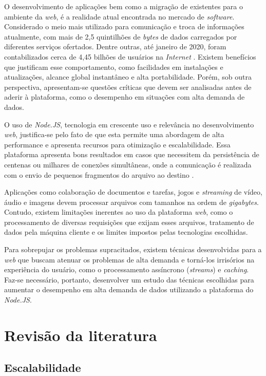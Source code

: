 \documentclass[12pt]{article}
\begin{document}
O desenvolvimento de aplicações bem como a migração de existentes para o ambiente da \textit{web},
é a realidade atual encontrada no mercado de \textit{software}. Considerado o meio mais utilizado
para comunicação e troca de informações atualmente, com mais de 2,5 quintilhões de \textit{bytes} de dados
carregados por diferentes serviços ofertados. Dentre outras, até janeiro de 2020, foram 
contabilizados cerca de 4,45 bilhões de usuários na \textit{Internet} \cite{WEBUSAGE}. 
Existem benefícios que justificam esse comportamento, como facilidades em instalações e atualizações, 
alcance global instantâneo e alta portabilidade. Porém, sob outra perspectiva, apresentam-se questões 
críticas que devem ser analisadas antes de aderir à plataforma, como o desempenho em situações com 
alta demanda de dados.

O uso de \textit{Node.JS}, tecnologia em crescente uso e relevância no
desenvolvimento \textit{web}, justifica-se pelo fato de que esta permite uma abordagem de alta
performance e apresenta recursos para otimização e escalabilidade. Essa plataforma apresenta
bons resultados em casos que necessitem da persistência de centenas ou milhares de conexões
simultâneas, onde a comunicação é realizada com o envio de pequenos fragmentos do arquivo ao destino
\cite[p. 112]{EJSMONT}.

Aplicações como colaboração de documentos e tarefas, jogos e \textit{streaming} de vídeo, áudio e imagens
\cite{ZRHR} devem processar arquivos com tamanhos na ordem de \textit{gigabytes}. 
Contudo, existem limitações inerentes ao uso da plataforma \textit{web}, como o processamento de 
diversas requisições que exijam esses arquivos, tratamento de dados pela máquina 
cliente e os limites impostos pelas tecnologias escolhidas.

Para sobrepujar os problemas supracitados, existem técnicas desenvolvidas para a \textit{web} que buscam
atenuar os problemas de alta demanda e torná-los irrisórios na experiência do usuário, como o processamento
assíncrono (\textit{streams}) e \textit{caching}. Faz-se necessário, portanto, desenvolver um estudo das 
técnicas escolhidas para aumentar o desempenho em alta demanda de dados utilizando a plataforma do \textit{Node.JS}.


\section{Revisão da literatura}

\subsection{Escalabilidade}
\end{document}
